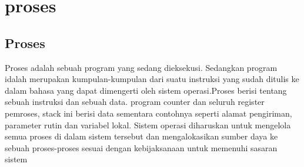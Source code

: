 
\section{proses}

	\subsection{Proses}	
	Proses adalah sebuah  program yang sedang dieksekusi. Sedangkan program idalah merupakan kumpulan-kumpulan  dari suatu  instruksi yang sudah ditulis ke dalam bahasa yang dapat  dimengerti oleh sistem operasi.Proses berisi tentang sebuah instruksi dan sebuah data. program counter dan seluruh register pemroses, stack ini  berisi data sementara contohnya seperti alamat pengiriman, parameter rutin dan variabel lokal. Sistem operasi diharuskan untuk mengelola semua proses di dalam sistem tersebut dan mengalokasikan sumber daya ke sebuah  proses-proses sesuai dengan kebijaksanaan untuk memenuhi sasaran sistem
	
